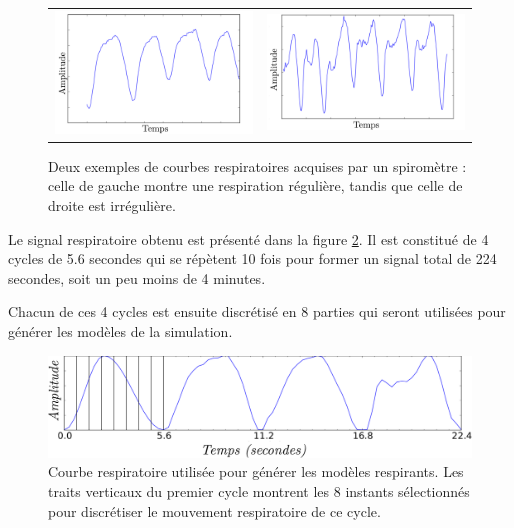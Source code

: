 \begin{figure}
 \centering
 \begin{tabular}{c c}
 \includegraphics[width=8cm]{images/respiReguliere} &
 \includegraphics[width=8cm]{images/respiIrreguliere}
 \end{tabular}
 \caption[Exemple de courbes respiratoires régulières et irrégulières]{Deux exemples de courbes respiratoires acquises par un spiromètre : celle de gauche montre une respiration régulière, tandis que celle de droite est irrégulière.}
 \label{fig:variabCycle}
\end{figure}


Le signal respiratoire obtenu est présenté dans la figure \ref{fig:cycleRespi}. Il est constitué de 4 cycles de 5.6 secondes qui se répètent 10 fois pour former un signal total de 224 secondes, soit un peu moins de 4 minutes. 

Chacun de ces 4 cycles est ensuite discrétisé en 8 parties qui seront utilisées pour générer les modèles de la simulation. 


\begin{figure}
 \centering
 \includegraphics[width=12cm]{images/courbesRespi}

 \caption[Signal respiratoire utilisé pour les modèles de la base de données]{Courbe respiratoire utilisée pour générer les modèles respirants. Les traits verticaux du premier cycle montrent les 8 instants sélectionnés pour discrétiser le mouvement respiratoire de ce cycle.}
 \label{fig:cycleRespi}
\end{figure}

